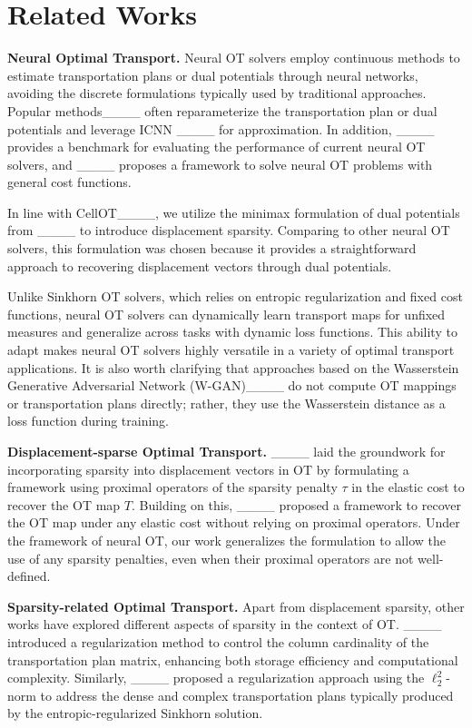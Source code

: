 \section{Related Works}
\textbf{Neural Optimal Transport. }Neural OT solvers employ continuous methods to estimate transportation plans or dual potentials through neural networks, avoiding the discrete formulations typically used by traditional approaches. Popular methods____ often reparameterize the transportation plan or dual potentials and leverage ICNN ____ for approximation. In addition, ____ provides a benchmark for evaluating the performance of current neural OT solvers, and ____ proposes a framework to solve neural OT problems with general cost functions.

In line with CellOT____, we utilize the minimax formulation of dual potentials from ____ to introduce displacement sparsity. Comparing to other neural OT solvers, this formulation was chosen because it provides a straightforward approach to recovering displacement vectors through dual potentials. 

Unlike Sinkhorn OT solvers, which relies on entropic regularization and fixed cost functions, neural OT solvers can dynamically learn transport maps for unfixed measures and generalize across tasks with dynamic loss functions. This ability to adapt makes neural OT solvers highly versatile in a variety of optimal transport applications. It is also worth clarifying that approaches based on the Wasserstein Generative Adversarial Network (W-GAN)____ do not compute OT mappings or transportation plans directly; rather, they use the Wasserstein distance as a loss function during training.

\textbf{Displacement-sparse Optimal Transport. }____ laid the groundwork for incorporating sparsity into displacement vectors in OT by formulating a framework using proximal operators of the sparsity penalty \(\tau\) in the elastic cost to recover the OT map \(T\). Building on this, ____ proposed a framework to recover the OT map under any elastic cost without relying on proximal operators. Under the framework of neural OT, our work generalizes the formulation to allow the use of any sparsity penalties, even when their proximal operators are not well-defined.

\textbf{Sparsity-related Optimal Transport. }Apart from displacement sparsity, other works have explored different aspects of sparsity in the context of OT. ____ introduced a regularization method to control the column cardinality of the transportation plan matrix, enhancing both storage efficiency and computational complexity. Similarly, ____ proposed a regularization approach using the \(\ell^2_2\)-norm to address the dense and complex transportation plans typically produced by the entropic-regularized Sinkhorn solution.